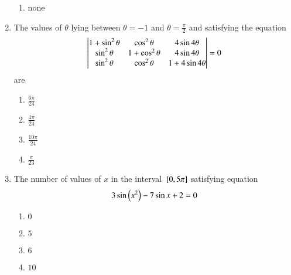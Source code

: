 \begin{enumerate}[label=\thesubsection.\arabic*,ref=\thesubsection.\theenumi]
\begin{multicols}{5}
\begin{enumerate}
\item none
\end{enumerate}
\end{multicols}
\item The values of $\theta$ lying between $\theta = -1$ and $\theta = \frac{\pi}{2}$ and satisfying the equation
\hfill{}
	\begin{align*}
	\begin{vmatrix}
1+\sin^2\theta & \cos^2\theta & 4\sin4\theta
\\
\sin^2\theta & 1+\cos^2\theta & 4\sin4\theta
\\
\sin^2\theta & \cos^2\theta & 1+4\sin4\theta
\end{vmatrix}=0
	\end{align*}
are
\begin{multicols}{4}
\begin{enumerate}
\item $\frac{6\pi}{24}$
\item $\frac{4\pi}{24}$
\item $\frac{10\pi}{24}$
\item $\frac{\pi}{23}$
\end{enumerate}
\end{multicols}
\item The number of values of $x$ in the interval ${}\left[0,5\pi\right]$ satisfying equation 
\hfill{} 
$$3 \sin{\ensuremath{\left(x^2\right)}}-7 \sin{x+2}=0$$  
\begin{multicols}{4}
\begin{enumerate}
    \item $0$
    \item $5$
    \item $6$
    \item $10$
\end{enumerate}
\end{multicols}


\end{enumerate}
